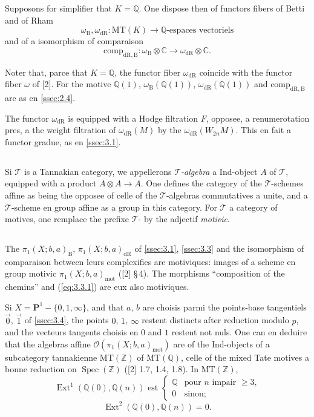 \documentclass[11pt,a4paper]{article}
\theoremstyle{plain}
\theoremstyle{definition}
\DeclareMathOperator{\Ext}{Ext}
\DeclareMathOperator{\Spec}{Spec}
\newcommand{\Z}{\mathbb{Z}}
\newcommand{\Q}{\mathbb{Q}}
\newcommand{\C}{\mathbb{C}}
\newcommand{\dR}{\mathrm{dR}}
\newcommand{\B}{\mathrm{B}}
\newcommand{\mot}{\mathrm{mot}}
\newcommand{\comp}{\mathrm{comp}}
\newcommand{\MT}{\mathrm{MT}}
\begin{document}
Supposons for simplifier that $K = \Q$. One dispose then of functors fibers of Betti and of Rham
\[
\omega_{\B}, \omega_{\dR}: \MT(K) \to \Q\text{-espaces vectoriels}
\]
and of a isomorphism of comparaison
\[
\comp_{\dR,\B}: \omega_{\B} \otimes \C \to \omega_{\dR} \otimes \C.
\]

Noter that, parce that $K = \Q$, the functor fiber $\omega_{\dR}$ coincide with the functor fiber $\omega$ of [2]. For the motive $\Q(1)$, $\omega_{\B}(\Q(1))$, $\omega_{\dR}(\Q(1))$ and $\comp_{\dR,\B}$ are as en \ref{ssec:2.4}.

The functor $\omega_{\dR}$ is equipped with a Hodge filtration $F$, opposee, a renumerotation pres, a the weight filtration of $\omega_{\dR}(M)$ by the $\omega_{\dR}(W_{2n} M)$. This en fait a functor gradue, as en \ref{ssec:3.1}.

\subsection{}\label{ssec:5.3}

Si $\mathcal{T}$ is a Tannakian category, we appellerons \emph{$\mathcal{T}$-algebra} a Ind-object $A$ of $\mathcal{T}$, equipped with a product $A \otimes A \to A$. One defines the category of the $\mathcal{T}$-schemes affine as being the opposee of celle of the $\mathcal{T}$-algebras commutatives a unite, and a $\mathcal{T}$-scheme en group affine as a group in this category. For $\mathcal{T}$ a category of motives, one remplace the prefixe $\mathcal{T}$- by the adjectif \emph{motivic}.

\subsection{}\label{ssec:5.4}

The $\pi_1(X;b,a)_{\B}$, $\pi_1(X;b,a)_{\dR}$ of \ref{ssec:3.1}, \ref{ssec:3.3} and the isomorphism of comparaison between leurs complexifies are motiviques: images of a scheme en group motivic $\pi_1(X;b,a)_{\mot}$ ([2] \S\,4). The morphisms ``composition of the chemins'' and (\ref{eq:3.3.1}) are eux also motiviques.

Si $X = \mathbf{P}^1 - \{0,1,\infty\}$, and that $a$, $b$ are choisis parmi the points-base tangentiels $\vec{0}$, $\vec{1}$ of \ref{ssec:3.4}, the points $0$, $1$, $\infty$ restent distincts after reduction modulo $p$, and the vecteurs tangents choisis en $0$ and $1$ restent not nuls. One can en deduire that the algebras affine $\mathcal{O}(\pi_1(X;b,a)_{\mot})$ are of the Ind-objects of a subcategory tannakienne $\MT(\Z)$ of $\MT(\Q)$, celle of the mixed Tate motives a bonne reduction on $\Spec(\Z)$ ([2] 1.7, 1.4, 1.8). In $\MT(\Z)$,
\begin{equation}\label{eq:5.4.1}
\Ext^1(\Q(0),\Q(n)) \text{ est } \begin{cases} \Q & \text{pour $n$ impair $\geq 3$,} \\ 0 & \text{sinon;} \end{cases}
\end{equation}
\begin{equation}\label{eq:5.4.2}
\Ext^2(\Q(0),\Q(n)) = 0.
\end{equation}
\end{document}
